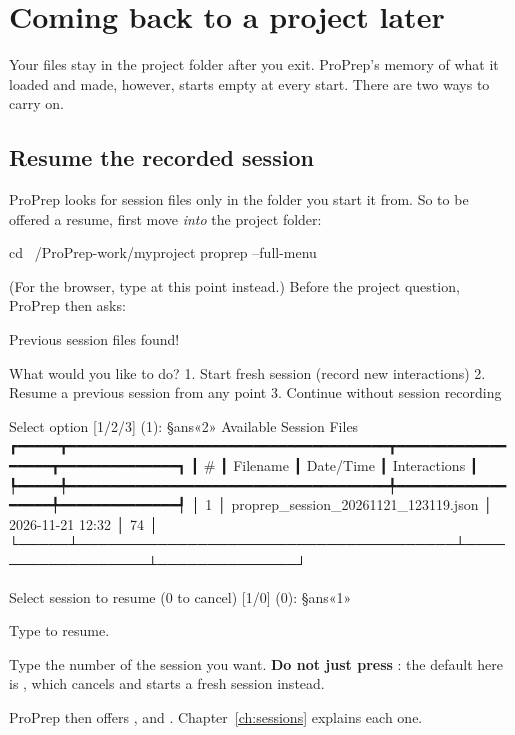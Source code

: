 \section{Coming back to a project later}\label{sec:starting-resume}

Your files stay in the project folder after you exit. ProPrep's memory of what
it loaded and made, however, starts empty at every start. There are two ways to
carry on.

\subsection*{Resume the recorded session}

ProPrep looks for session files only in the folder you start it from. So to be
offered a resume, first move \emph{into} the project folder:

\begin{terminal}
cd ~/ProPrep-work/myproject
proprep --full-menu
\end{terminal}

(For the browser, type  at this point instead.) Before the
project question, ProPrep then asks:

\begin{screen}
Previous session files found!

What would you like to do?
  1. Start fresh session (record new interactions)
  2. Resume a previous session from any point
  3. Continue without session recording

Select option  [1/2/3] (1): §ans«2»
                          Available Session Files
┏━━━━━┳━━━━━━━━━━━━━━━━━━━━━━━━━━━━━━━━━━━━━━┳━━━━━━━━━━━━━━━━━━┳━━━━━━━━━━━━━━┓
┃ #   ┃ Filename                             ┃ Date/Time        ┃ Interactions ┃
┡━━━━━╇━━━━━━━━━━━━━━━━━━━━━━━━━━━━━━━━━━━━━━╇━━━━━━━━━━━━━━━━━━╇━━━━━━━━━━━━━━┩
│ 1   │ proprep_session_20261121_123119.json │ 2026-11-21 12:32 │ 74           │
└─────┴──────────────────────────────────────┴──────────────────┴──────────────┘

Select session to resume (0 to cancel)  [1/0] (0): §ans«1»
\end{screen}

\begin{steps}
  \item Type  to resume.
  \item Type the number of the session you want. \textbf{Do not just press
  }: the default here is , which cancels and starts a fresh
  session instead.
  \item ProPrep then offers ,  and . Chapter~\ref{ch:sessions} explains
  each one.
\end{steps}

